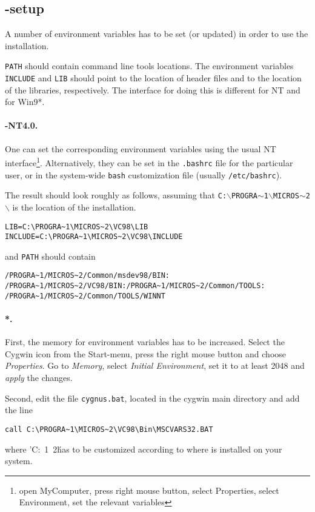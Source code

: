 \subsection{-setup}
A number of environment variables has to be set (or updated)
in order to use the installation.

\texttt{PATH} should contain  command line tools locations.
The environment variables \texttt{INCLUDE} and \texttt{LIB} should
point to the location of  header files and to the location
of the  libraries, respectively.
The interface for doing this is different for NT and for Win9*.

\paragraph{\mswin-NT4.0.}
One can set the corresponding environment variables using the
usual NT interface\footnote{open MyComputer, press right mouse button,
  select Properties, select Environment, set the relevant variables}.
Alternatively, they can be set in the \texttt{.bashrc} file for the
particular user, or in the system-wide \texttt{bash} customization
file (usually \texttt{/etc/bashrc}).

The result should look roughly as follows, assuming that
\texttt{C:$\backslash$PROGRA$\sim$1$\backslash$MICROS$\sim$2$\backslash$}
is the location of the \msvc{} installation.
\begin{verbatim}
LIB=C:\PROGRA~1\MICROS~2\VC98\LIB
INCLUDE=C:\PROGRA~1\MICROS~2\VC98\INCLUDE
\end{verbatim}
and \texttt{PATH} should contain
\begin{verbatim}
/PROGRA~1/MICROS~2/Common/msdev98/BIN:
/PROGRA~1/MICROS~2/VC98/BIN:/PROGRA~1/MICROS~2/Common/TOOLS:
/PROGRA~1/MICROS~2/Common/TOOLS/WINNT
\end{verbatim}

\paragraph{*.} 
First, the memory for environment variables has to be increased.
Select the Cygwin icon from the Start-menu, press the right mouse
button and choose \textit{Properties}. Go to \textit{Memory}, select
\textit{Initial Environment}, set it to at least 2048 and
\textit{apply} the changes.

Second, edit the file \texttt{cygnus.bat}, located in the cygwin main
directory and add the line
\begin{verbatim}
call C:\PROGRA~1\MICROS~2\VC98\Bin\MSCVARS32.BAT
\end{verbatim}
where
\nonlinkedpath'C:\PROGRA~1\MICROS~2\'
has to be customized according to where \msvc{} is installed on your
system.

